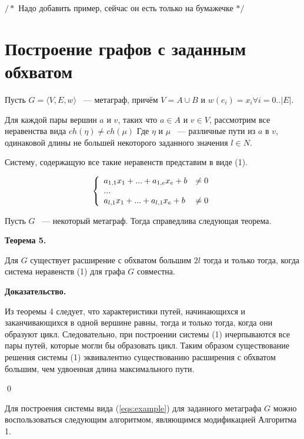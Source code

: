 \documentclass[14pt]{mmcs-article}
\begin{document}
$/*$ Надо добавить пример, сейчас он есть только на бумажечке $*/$

\pagebreak
\section*{Построение графов с заданным обхватом}

Пусть $G = \langle V, E, w \rangle$ ~--- метаграф, причём $V = A \cup B$ и $w(e_i) = x_i \forall i = 0..|E|$.

Для каждой пары вершин $a$ и $v$, таких что $a \in A$ и $v \in V$, рассмотрим все неравенства вида $ch(\eta) \neq ch(\mu)$ Где $\eta$ и $\mu$ ~--- различные пути из $a$ в $v$, одинаковой длины не большей некоторого заданного значения $l \in N$.

Систему, содержащую все такие неравенств представим в виде (1).

\begin{equation}
    \centering
    \left\{
        \begin{array}{ll}
            a_{1,1} x_1 + ... + a_{1,e} x_e + b &\neq 0\\
            ...\\
            a_{l,1} x_1 + ... + a_{l,1} x_e + b &\neq 0\\
        \end{array}
    \right.
    \label{eqs:example}
\end{equation}

Пусть $G$ ~--- некоторый метаграф. Тогда справедлива следующая теорема.

\textbf{Теорема 5.}

Для $G$ существует расширение с обхватом большим $2l$  тогда и только тогда, когда система неравенств (1) для графа $G$ совместна.

\textbf{Доказательство.}

Из теоремы 4 следует, что характеристики путей, начинающихся и заканчивающихся в одной вершине равны, тогда и только тогда, когда они образуют цикл. Следовательно, при построении системы (1) ичерпываются все пары путей, которые могли бы образовать цикл. Таким образом существование решения системы (1) эквивалентно существованию расширения с обхватом большим, чем удвоенная длина максимального пути.

\qed

Для построения системы вида (\ref{eqs:example}) для заданного метаграфа $G$ можно воспользоваться следующим алгоритмом, являющимся модификацией Алгоритма 1.
\end{document}
